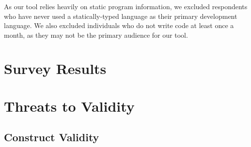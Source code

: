 \par As our tool relies heavily on static program information, we excluded
respondents who have never used a statically-typed language as their primary
development language. 
We also excluded individuals who do not write code at least once a month,
as they may not be the primary audience for our tool.

\section{Survey Results}
\label{sec:SurveyResults}


\section{Threats to Validity}
\label{sec:ThreatsToValidity}


\subsection{Construct Validity}
\label{subsec:ConstructValidity}

\endinput

